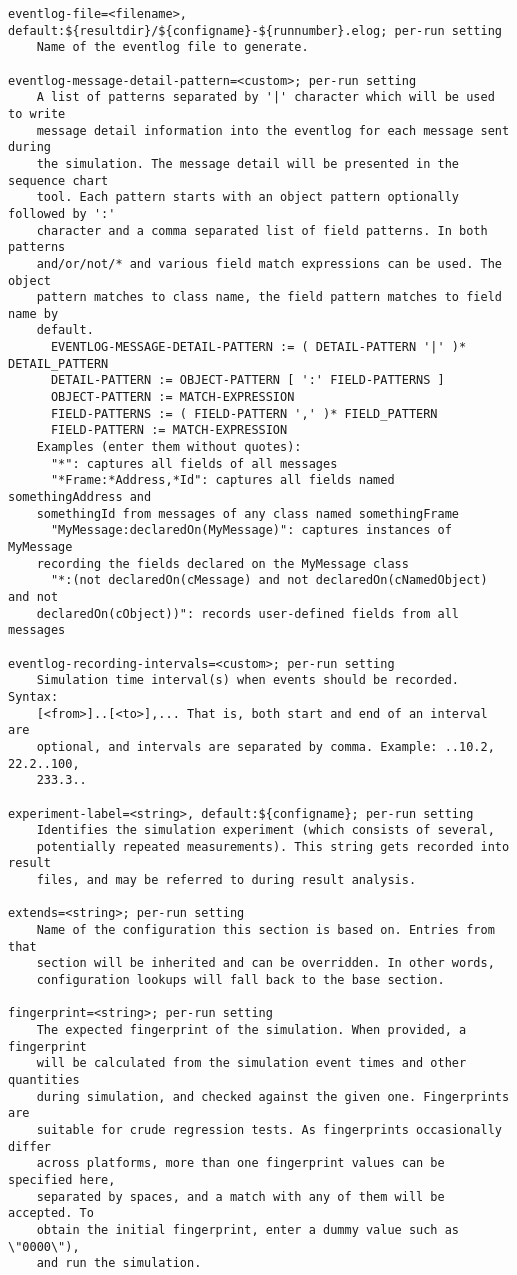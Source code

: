 \begin{verbatim}
eventlog-file=<filename>, default:${resultdir}/${configname}-${runnumber}.elog; per-run setting
    Name of the eventlog file to generate.

eventlog-message-detail-pattern=<custom>; per-run setting
    A list of patterns separated by '|' character which will be used to write
    message detail information into the eventlog for each message sent during
    the simulation. The message detail will be presented in the sequence chart
    tool. Each pattern starts with an object pattern optionally followed by ':'
    character and a comma separated list of field patterns. In both patterns
    and/or/not/* and various field match expressions can be used. The object
    pattern matches to class name, the field pattern matches to field name by
    default.
      EVENTLOG-MESSAGE-DETAIL-PATTERN := ( DETAIL-PATTERN '|' )* DETAIL_PATTERN
      DETAIL-PATTERN := OBJECT-PATTERN [ ':' FIELD-PATTERNS ]
      OBJECT-PATTERN := MATCH-EXPRESSION
      FIELD-PATTERNS := ( FIELD-PATTERN ',' )* FIELD_PATTERN
      FIELD-PATTERN := MATCH-EXPRESSION
    Examples (enter them without quotes):
      "*": captures all fields of all messages
      "*Frame:*Address,*Id": captures all fields named somethingAddress and
    somethingId from messages of any class named somethingFrame
      "MyMessage:declaredOn(MyMessage)": captures instances of MyMessage
    recording the fields declared on the MyMessage class
      "*:(not declaredOn(cMessage) and not declaredOn(cNamedObject) and not
    declaredOn(cObject))": records user-defined fields from all messages

eventlog-recording-intervals=<custom>; per-run setting
    Simulation time interval(s) when events should be recorded. Syntax:
    [<from>]..[<to>],... That is, both start and end of an interval are
    optional, and intervals are separated by comma. Example: ..10.2, 22.2..100,
    233.3..

experiment-label=<string>, default:${configname}; per-run setting
    Identifies the simulation experiment (which consists of several,
    potentially repeated measurements). This string gets recorded into result
    files, and may be referred to during result analysis.

extends=<string>; per-run setting
    Name of the configuration this section is based on. Entries from that
    section will be inherited and can be overridden. In other words,
    configuration lookups will fall back to the base section.

fingerprint=<string>; per-run setting
    The expected fingerprint of the simulation. When provided, a fingerprint
    will be calculated from the simulation event times and other quantities
    during simulation, and checked against the given one. Fingerprints are
    suitable for crude regression tests. As fingerprints occasionally differ
    across platforms, more than one fingerprint values can be specified here,
    separated by spaces, and a match with any of them will be accepted. To
    obtain the initial fingerprint, enter a dummy value such as \"0000\"),
    and run the simulation.


\end{verbatim}
